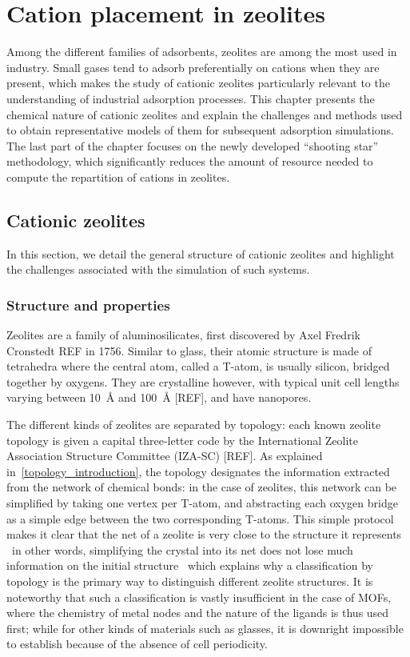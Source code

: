 \documentclass[main.tex]{subfiles}
\begin{document}
\chapter{Cation placement in zeolites}
\vspace*{-1\baselineskip}

Among the different families of adsorbents, zeolites are among the most used in industry. Small gases tend to adsorb preferentially on cations when they are present, which makes the study of cationic zeolites particularly relevant to the understanding of industrial adsorption processes. This chapter presents the chemical nature of cationic zeolites and explain the challenges and methods used to obtain representative models of them for subsequent adsorption simulations. The last part of the chapter focuses on the newly developed ``shooting star'' methodology, which significantly reduces the amount of resource needed to compute the repartition of cations in zeolites.

\section{Cationic zeolites}

In this section, we detail the general structure of cationic zeolites and highlight the challenges associated with the simulation of such systems.

\subsection{Structure and properties}

Zeolites are a family of aluminosilicates, first discovered by Axel Fredrik Cronstedt REF in 1756. Similar to glass, their atomic structure is made of tetrahedra where the central atom, called a T-atom, is usually silicon, bridged together by oxygens. They are crystalline however, with typical unit cell lengths varying between \qty{10}{\angstrom} and \qty{100}{\angstrom} [REF], and have nanopores.

The different kinds of zeolites are separated by topology: each known zeolite topology is given a capital three-letter code by the International Zeolite Association Structure Committee (IZA-SC) [REF]. As explained in~\autoref{topology_introduction}, the topology designates the information extracted from the network of chemical bonds: in the case of zeolites, this network can be simplified by taking one vertex per T-atom, and abstracting each oxygen bridge as a simple edge between the two corresponding T-atoms. This simple protocol makes it clear that the net of a zeolite is very close to the structure it represents \en~in other words, simplifying the crystal into its net does not lose much information on the initial structure \en~which explains why a classification by topology is the primary way to distinguish different zeolite structures. It is noteworthy that such a classification is vastly insufficient in the case of MOFs, where the chemistry of metal nodes and the nature of the ligands is thus used first; while for other kinds of materials such as glasses, it is downright impossible to establish because of the absence of cell periodicity.
\end{document}
